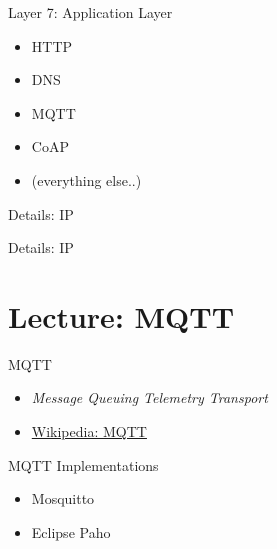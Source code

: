 \begin{frame}{Layer 7: Application Layer}
\protect\hypertarget{layer-7-application-layer}{}

\begin{itemize}
\tightlist
\item
  HTTP
\item
  DNS
\item
  MQTT
\item
  CoAP
\item
  (everything else..)
\end{itemize}

\end{frame}

\begin{frame}{Details: IP}
\protect\hypertarget{details-ip}{}


\end{frame}

\begin{frame}{Details: IP}
\protect\hypertarget{details-ip-1}{}

\end{frame}

\hypertarget{lecture-mqtt}{%
\section{Lecture: MQTT}\label{lecture-mqtt}}

\begin{frame}{MQTT}
\protect\hypertarget{mqtt}{}

\begin{itemize}
\tightlist
\item
  \emph{Message Queuing Telemetry Transport}
\item
  \href{https://en.wikipedia.org/wiki/MQTT}{Wikipedia: MQTT}
\end{itemize}

\end{frame}

\begin{frame}{MQTT Implementations}
\protect\hypertarget{mqtt-implementations}{}

\begin{itemize}
\tightlist
\item
  Mosquitto
\item
  Eclipse Paho
\end{itemize}

\end{frame}

